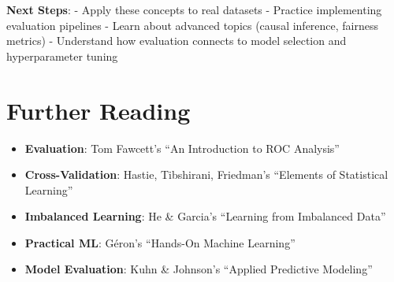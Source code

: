 \documentclass{article}
\begin{document}
\textbf{Next Steps}:
- Apply these concepts to real datasets
- Practice implementing evaluation pipelines
- Learn about advanced topics (causal inference, fairness metrics)
- Understand how evaluation connects to model selection and hyperparameter tuning

\section{Further Reading}

\begin{itemize}
    \item \textbf{Evaluation}: Tom Fawcett's ``An Introduction to ROC Analysis''
    \item \textbf{Cross-Validation}: Hastie, Tibshirani, Friedman's ``Elements of Statistical Learning''
    \item \textbf{Imbalanced Learning}: He \& Garcia's ``Learning from Imbalanced Data''
    \item \textbf{Practical ML}: Géron's ``Hands-On Machine Learning''
    \item \textbf{Model Evaluation}: Kuhn \& Johnson's ``Applied Predictive Modeling''
\end{itemize}
\end{document}
